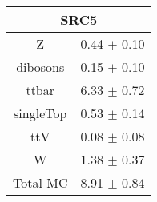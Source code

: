 \begin{tabular}{c|c}
\hline\hline
\multicolumn{2}{c}{\bf SRC5 } \\ \hline 
Z & 0.44 $\pm$ 0.10 \\
dibosons & 0.15 $\pm$ 0.10 \\
ttbar & 6.33 $\pm$ 0.72 \\
singleTop & 0.53 $\pm$ 0.14 \\
ttV & 0.08 $\pm$ 0.08 \\
W & 1.38 $\pm$ 0.37 \\
\hline
Total MC & 8.91 $\pm$ 0.84 \\
\hline\hline
\end{tabular}
